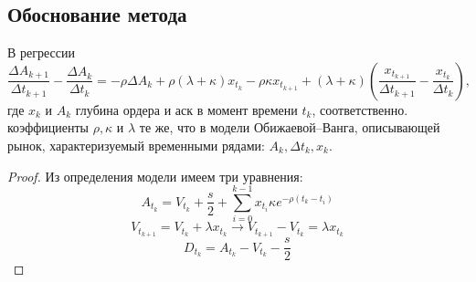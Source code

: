 \begin{appendices} %



	\section{Обоснование метода}
        
        \begin{theorem}
                В регрессии                                                                                                                                                                                                                                                                                                                                                                                       
                \begin{equation*}
                        \frac{\Delta A_{k+1}}{\Delta t_{k+1}} - \frac{\Delta A_{k}}{\Delta t_{k}}
                        = -\rho \Delta A_k + \rho (\lambda + \kappa) x_{t_k} - \rho \kappa x_{t_{k+1}} + 
                        (\lambda + \kappa) \left(\frac{x_{t_{k+1}}}{\Delta t_{k+1}} - \frac{x_{t_k}}{\Delta t_{k}}\right),
                \end{equation*}
                где $x_{k}$ и $A_{k}$ глубина ордера и аск в момент времени $t_k$, соответственно. \\

                коэффициенты $\rho, \kappa$ и $\lambda$ те же, что в модели Обижаевой--Ванга, описывающей рынок,
                характеризуемый временными рядами: $A_k, \Delta t _k, x_k$.
        


\end{theorem}
\begin{proof}
        Из определения модели имеем три уравнения:
        \begin{equation} \label{rp1}
                A_{t_k} = V_{t_k} + \frac{s}{2} + \sum _{i=0} ^{k-1} x_{t_i} \kappa e^{- \rho (t_k - t_i)}
        \end{equation}
        \begin{equation}\label{rp2}
                V_{t_{k+1}} = V_{t_k} + \lambda x_{t_k} \rightarrow V_{t_{k+1}} - V_{t_k} = \lambda x_{t_{k}}
        \end{equation}
        \begin{equation} \label{rp3}
                D_{t_k} = A_{t_k} - V_{t_k} - \frac{s}{2}
        \end{equation}


\end{proof}
\end{appendices}
